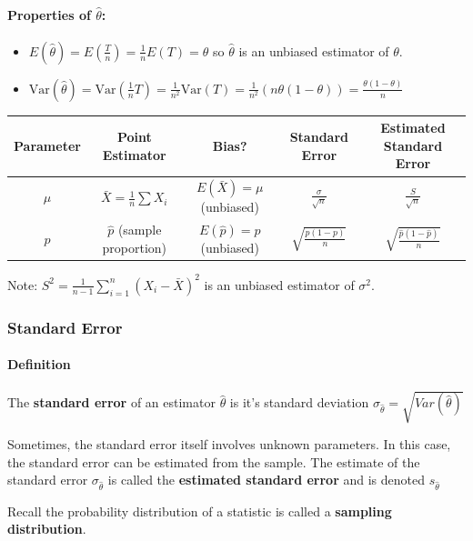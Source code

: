 \paragraph*{Properties of $\hat{\theta}$:}
\begin{itemize}
    \item $E(\hat{\theta}) = E(\frac{T}{n}) = \frac{1}{n} E(T) = \theta$ so $\hat{\theta}$ is an unbiased estimator of $\theta$.
    \item $\text{Var}(\hat{\theta}) = \text{Var}(\frac{1}{n} T) = \frac{1}{n^2} \text{Var}(T) = \frac{1}{n^2} (n \theta (1 - \theta)) = \frac{\theta (1 - \theta)}{n}$
\end{itemize}
\begin{table}[h]
    \centering
    \begin{tabular}{|c|c|c|c|c|}
        \hline
        Parameter & Point Estimator & Bias? & Standard Error & Estimated Standard Error \\
        \hline
        $\mu$ & $\bar{X} = \frac{1}{n} \sum X_i$ & $E(\bar{X}) = \mu$ (unbiased) & $\frac{\sigma}{\sqrt{n}}$ & $\frac{S}{\sqrt{n}}$ \\
        \hline
        $p$ & $\hat{p}$ (sample proportion) & $E(\hat{p}) = p$ (unbiased) & $\sqrt{\frac{p(1 - p)}{n}}$ & $\sqrt{\frac{\hat{p}(1 - \hat{p})}{n}}$ \\
        \hline
    \end{tabular}
\end{table}

Note: $S^2 = \frac{1}{n - 1} \sum_{i=1}^n (X_i - \bar{X})^2$ is an unbiased estimator of $\sigma^2$.

\subsubsection*{Standard Error}
\paragraph*{Definition}
The \textbf{standard error} of an estimator $\hat{\theta}$ is it's standard deviation $\sigma_{\hat{\theta}} = \sqrt{Var(\hat{\theta})}$

Sometimes, the standard error itself involves unknown parameters. In this case, the standard error can be estimated from the sample. The estimate of the standard error $\sigma_{\hat{\theta}}$ is called the \textbf{estimated standard error} and is denoted $s_{\hat{\theta}}$

Recall the probability distribution of a statistic is called a \textbf{sampling distribution}.


